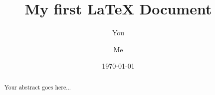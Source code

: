 \documentclass[a4paper]{article}
\begin{document}
\title{My first LaTeX Document}
\author{You \and Me}
\date{\today}
\maketitle 

\begin{abstract}
Your abstract goes here...
\end{abstract}
\end{document}
